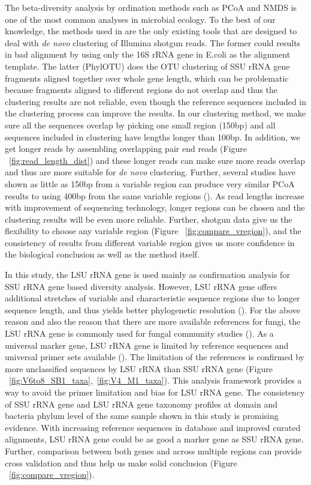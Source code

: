 \documentclass[12pt]{article}
\begin{document}
The beta-diversity analysis by ordination methods such as PCoA and
NMDS is one of the most common analyses in microbial ecology. To the
best of our knowledge, the methods used in \cite{kostas2013,phylotu}
are the only existing tools that are designed to deal with {\em de
novo} clustering of Illumina shotgun reads. The former could results
in bad alignment by using only the 16S rRNA gene in E.coli as the alignment
template. The latter (PhylOTU) does the OTU clustering of SSU rRNA
gene fragments aligned together over whole gene length, which can be
problematic because fragments aligned to different regions do not
overlap and thus the clustering results are not reliable, even though
the reference sequences included in the clustering process can improve
the results. In our clustering method, we make sure all the sequences
overlap by picking one small region (150bp) and all sequences included
in clustering have lengths longer than 100bp. In addition, we get
longer reads by assembling overlapping pair end reads (Figure
~\ref{fig:read_length_dist}) and these longer reads can make sure more reads
overlap and thus are more suitable for {\em de novo} clustering. Further,
several studies have shown as little as 150bp from a variable region can produce very
similar PCoA results to using 400bp from the same variable regions
(\cite{robknight2007,caporaso2012miseq}). As read lengths increase
with improvement of sequencing technology, longer regions can be
chosen and the clustering results will be even more reliable. Further,
shotgun data give us the flexibility to choose any variable region
(Figure ~\ref{fig:compare_vregion}), and the consistency of results from
different variable region gives us more confidence in the biological
conclusion as well as the method itself.

In this study, the LSU rRNA gene is used mainly as confirmation analysis
for SSU rRNA gene based diversity analysis. However, LSU rRNA gene
offers additional stretches of variable and characteristic sequence
regions due to longer sequence length, and thus yields better phylogenetic
resolution (\cite{lsuprimer}). For the above reason and also the
reason that there are more available references for fungi, the LSU rRNA
gene is commonly used for fungal community studies
(\cite{lsufungal2007,lsuclassifier,lsufungal2012,lsufungal2010}). As a
universal marker gene, LSU rRNA gene is limited by reference sequences
and universal primer sets available (\cite{lsuprimer}). The limitation
of the references is confirmed by more unclassified sequences by LSU
rRNA than SSU rRNA gene (Figure
~\ref{fig:V6to8_SB1_taxa},~\ref{fig:V4_M1_taxa}). This analysis
framework provides a way to avoid the primer limitation and bias for
LSU rRNA gene. The consistency of SSU rRNA gene and LSU rRNA gene
taxonomy profiles at domain and bacteria phylum level of the same
sample shown in this study is promising evidence. With increasing
reference sequences in database and improved curated alignments,
LSU rRNA gene could be as good a marker gene as SSU rRNA gene. Further,
comparison between both genes and across multiple regions can provide
cross validation and thus help us make solid conclusion (Figure
~\ref{fig:compare_vregion}).
\end{document}
